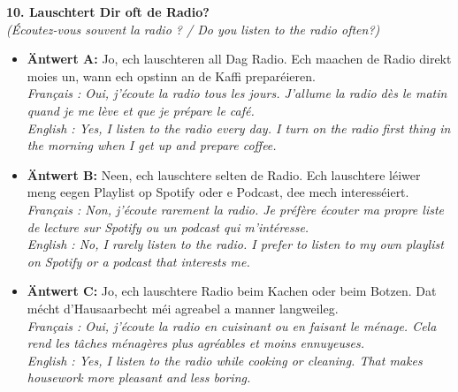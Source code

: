 \noindent\textbf{10. Lauschtert Dir oft de Radio?}\\
\textit{(Écoutez-vous souvent la radio ? / Do you listen to the radio often?)}
\begin{itemize}
    \item \textbf{Äntwert A:} Jo, ech lauschteren all Dag Radio. Ech maachen de Radio direkt moies un, wann ech opstinn an de Kaffi preparéieren.\\
    \textit{Français : Oui, j'écoute la radio tous les jours. J'allume la radio dès le matin quand je me lève et que je prépare le café.}\\
    \textit{English : Yes, I listen to the radio every day. I turn on the radio first thing in the morning when I get up and prepare coffee.}
    \item \textbf{Äntwert B:} Neen, ech lauschtere selten de Radio. Ech lauschtere léiwer meng eegen Playlist op Spotify oder e Podcast, dee mech interesséiert.\\
    \textit{Français : Non, j'écoute rarement la radio. Je préfère écouter ma propre liste de lecture sur Spotify ou un podcast qui m'intéresse.}\\
    \textit{English : No, I rarely listen to the radio. I prefer to listen to my own playlist on Spotify or a podcast that interests me.}
    \item \textbf{Äntwert C:} Jo, ech lauschtere Radio beim Kachen oder beim Botzen. Dat mécht d'Hausaarbecht méi agreabel a manner langweileg.\\
    \textit{Français : Oui, j'écoute la radio en cuisinant ou en faisant le ménage. Cela rend les tâches ménagères plus agréables et moins ennuyeuses.}\\
    \textit{English : Yes, I listen to the radio while cooking or cleaning. That makes housework more pleasant and less boring.}
\end{itemize}
\vspace{0.5em}

